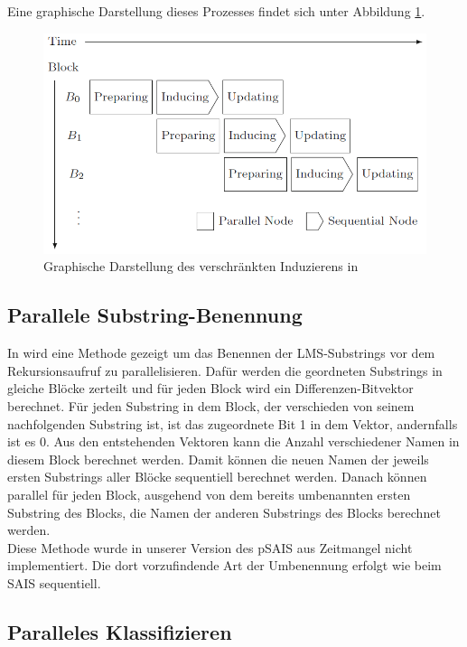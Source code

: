 Eine graphische Darstellung dieses Prozesses findet sich unter Abbildung \ref{psaisArch}.

\begin{figure}
\includegraphics[width=\textwidth]{kapitel/saca_algorithmen/psais/psais_architecture.png}
\caption{Graphische Darstellung des verschränkten Induzierens in \cite{psais}}
\label{psaisArch}
\end{figure}


\subsection{Parallele Substring-Benennung}

In \cite{psais} wird eine Methode gezeigt um das Benennen der LMS-Substrings vor dem Rekursionsaufruf zu parallelisieren. Dafür werden die geordneten Substrings in gleiche Blöcke zerteilt und für jeden Block wird ein Differenzen-Bitvektor berechnet. Für jeden Substring in dem Block, der verschieden von seinem nachfolgenden Substring ist, ist das zugeordnete Bit 1 in dem Vektor, andernfalls ist es 0. Aus den entstehenden Vektoren kann die Anzahl verschiedener Namen in diesem Block berechnet werden. Damit können die neuen Namen der jeweils ersten Substrings aller Blöcke sequentiell berechnet werden. Danach können parallel für jeden Block, ausgehend von dem bereits umbenannten ersten Substring des Blocks, die Namen der anderen Substrings des Blocks berechnet werden. \\

Diese Methode wurde in unserer Version des pSAIS aus Zeitmangel nicht implementiert. Die dort vorzufindende Art der Umbenennung erfolgt wie beim SAIS sequentiell.

\subsection{Paralleles Klassifizieren}
\label{subsection:psais_classifying}

